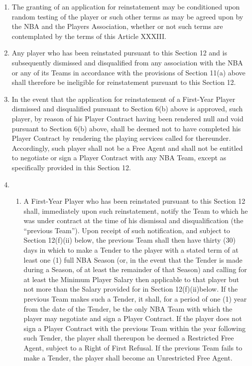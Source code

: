 \documentclass[
]{book}
\providecommand{\tightlist}{%
  \setlength{\itemsep}{0pt}\setlength{\parskip}{0pt}}
\begin{document}
\begin{enumerate}
\item
  The granting of an application for reinstatement may be conditioned upon random testing of the player or such other terms as may be agreed upon by the NBA and the Players Association, whether or not such terms are contemplated by the terms of this Article XXXIII.
\item
  Any player who has been reinstated pursuant to this Section 12 and is subsequently dismissed and disqualified from any association with the NBA or any of its Teams in accordance with the provisions of Section 11(a) above shall therefore be ineligible for reinstatement pursuant to this Section 12.
\item
  In the event that the application for reinstatement of a First-Year Player dismissed and disqualified pursuant to Section 6(b) above is approved, such player, by reason of his Player Contract having been rendered null and void pursuant to Section 6(b) above, shall be deemed not to have completed his Player Contract by rendering the playing services called for thereunder. Accordingly, such player shall not be a Free Agent and shall not be entitled to negotiate or sign a Player Contract with any NBA Team, except as specifically provided in this Section 12.
\item
  \begin{enumerate}
  \def\labelenumii{(\roman{enumii})}
  \tightlist
  \item
    A First-Year Player who has been reinstated pursuant to this Section 12 shall, immediately upon such reinstatement, notify the Team to which he was under contract at the time of his dismissal and disqualification (the ``previous Team''). Upon receipt of such notification, and subject to Section 12(f)(ii) below, the previous Team shall then have thirty (30) days in which to make a Tender to the player with a stated term of at least one (1) full NBA Season (or, in the event that the Tender is made during a Season, of at least the remainder of that Season) and calling for at least the Minimum Player Salary then applicable to that player but not more than the Salary provided for in Section 12(f)(ii)below. If the previous Team makes such a Tender, it shall, for a period of one (1) year from the date of the Tender, be the only NBA Team with which the player may negotiate and sign a Player Contract. If the player does not sign a Player Contract with the previous Team within the year following such Tender, the player shall thereupon be deemed a Restricted Free Agent, subject to a Right of First Refusal. If the previous Team fails to make a Tender, the player shall become an Unrestricted Free Agent.

\end{enumerate}
\end{enumerate}
\end{document}
